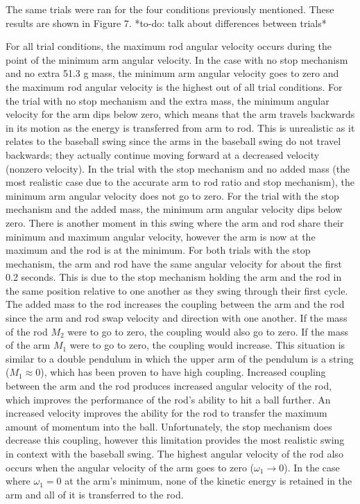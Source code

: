 \documentclass[%
 aip,
 amsmath,amssymb,
 reprint,%
 floatfix,%
]{revtex4-1}
\begin{document}
The same trials were ran for the four conditions previously mentioned. These results are shown in Figure 7. *to-do: talk about differences between trials*

For all trial conditions, the maximum rod angular velocity occurs during the point of the minimum arm angular velocity. In the case with no stop mechanism and no extra 51.3 g mass, the minimum arm angular velocity goes to zero and the maximum rod angular velocity is the highest out of all trial conditions. For the trial with no stop mechanism and the extra mass, the minimum angular velocity for the arm dips below zero, which means that the arm travels backwards in its motion as the energy is transferred from arm to rod. This is unrealistic as it relates to the baseball swing since the arms in the baseball swing do not travel backwards; they actually continue moving forward at a decreased velocity (nonzero velocity). In the trial with the stop mechanism and no added mass (the most realistic case due to the accurate arm to rod ratio and stop mechanism), the minimum arm angular velocity does not go to zero. For the trial with the stop mechanism and the added mass, the minimum arm angular velocity dips below zero. There is another moment in this swing where the arm and rod share their minimum and maximum angular velocity, however the arm is now at the maximum and the rod is at the minimum. For both trials with the stop mechanism, the arm and rod have the same angular velocity for about the first 0.2 seconds. This is due to the stop mechanism holding the arm and the rod in the same position relative to one another as they swing through their first cycle. The added mass to the rod increases the coupling between the arm and the rod since the arm and rod swap velocity and direction with one another. If the mass of the rod $M_2$ were to go to zero, the coupling would also go to zero. If the mass of the arm $M_1$ were to go to zero, the coupling would increase. This situation is similar to a double pendulum in which the upper arm of the pendulum is a string ($M_1 \approx 0$), which has been proven to have high coupling. Increased coupling between the arm and the rod produces increased angular velocity of the rod, which improves the performance of the rod's ability to hit a ball further. An increased velocity improves the ability for the rod to transfer the maximum amount of momentum into the ball. Unfortunately, the stop mechanism does decrease this coupling, however this limitation provides the most realistic swing in context with the baseball swing. The highest angular velocity of the rod also occurs when the angular velocity of the arm goes to zero ($\omega_1 \rightarrow 0$). In the case where $\omega_1 = 0$ at the arm's minimum, none of the kinetic energy is retained in the arm and all of it is transferred to the rod.
\end{document}
